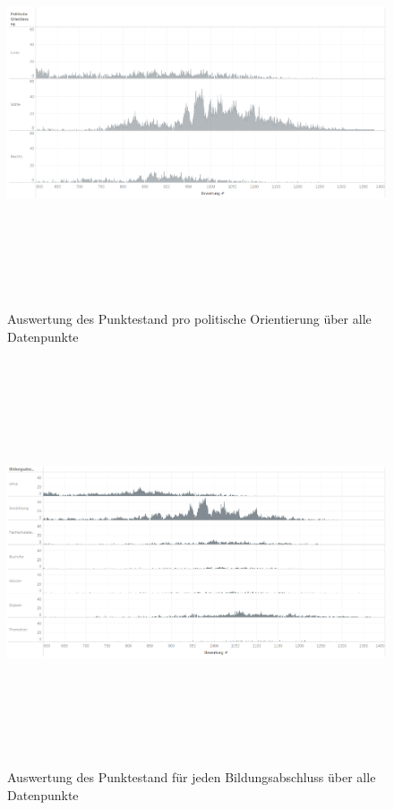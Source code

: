 \documentclass[a4paper,12pt]{report}
\begin{document}
\begin{figure}[!h]
    \centering
    \includegraphics[width=16cm,height=12cm]{Diagramme/SZ2_Tab4.PNG}
    \caption{Auswertung des Punktestand pro politische Orientierung über alle Datenpunkte}
    \label{fig:SZ2Tab4}
\end{figure}

\begin{figure}[!h]
    \centering
    \includegraphics[width=16cm,height=12cm]{Diagramme/SZ2_Tab5.PNG}
    \caption{Auswertung des Punktestand für jeden Bildungsabschluss über alle Datenpunkte}
    \label{fig:SZ2Tab5}
\end{figure}
\end{document}
